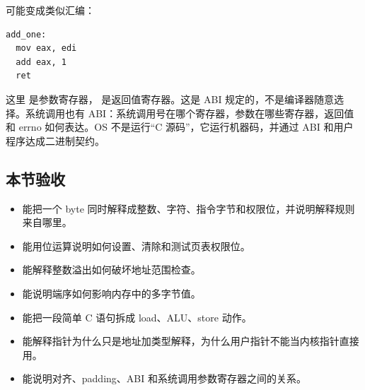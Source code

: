 可能变成类似汇编：

\begin{lstlisting}
add_one:
  mov eax, edi
  add eax, 1
  ret
\end{lstlisting}

这里  是参数寄存器， 是返回值寄存器。这是 ABI 规定的，不是编译器随意选择。系统调用也有 ABI：系统调用号在哪个寄存器，参数在哪些寄存器，返回值和 errno 如何表达。OS 不是运行“C 源码”，它运行机器码，并通过 ABI 和用户程序达成二进制契约。

\subsection{本节验收}

\begin{rubricbox}
\begin{itemize}
\tightlist
\item 能把一个 byte 同时解释成整数、字符、指令字节和权限位，并说明解释规则来自哪里。
\item 能用位运算说明如何设置、清除和测试页表权限位。
\item 能解释整数溢出如何破坏地址范围检查。
\item 能说明端序如何影响内存中的多字节值。
\item 能把一段简单 C 语句拆成 load、ALU、store 动作。
\item 能解释指针为什么只是地址加类型解释，为什么用户指针不能当内核指针直接用。
\item 能说明对齐、padding、ABI 和系统调用参数寄存器之间的关系。
\end{itemize}
\end{rubricbox}
